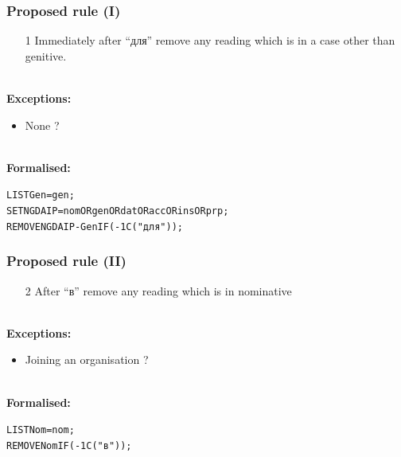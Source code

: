 \documentclass{beamer}
\begin{document}
\begin{frame}
  \frametitle{Proposed rule (I)}

  \begin{itemize}
    \item[1] Immediately after ``для'' remove any reading which is in a case other 
       than genitive.
  \end{itemize}
~\\
\textbf{Exceptions:}
  \begin{itemize}
    \item None ? 
  \end{itemize}
~\\
\textbf{Formalised:}

{\small
\begin{alltt}
  LIST Gen = gen ; \\
  SET NGDAIP = nom OR gen OR dat OR acc OR ins OR prp ;  \\
  REMOVE NGDAIP - Gen IF (-1C ("для")) ; \\
\end{alltt}
}
\end{frame}

\begin{frame}
  \frametitle{Proposed rule (II)}
 
  \begin{itemize}
    \item[2] After ``в'' remove any reading which is in nominative %

  \end{itemize}

~\\
\textbf{Exceptions:}
  \begin{itemize}
    \item Joining an organisation ?
  \end{itemize}

~\\
\textbf{Formalised:}
{\small
\begin{alltt}
  LIST Nom = nom ; \\
  REMOVE Nom IF (-1C ("в")) ;
\end{alltt}
}
\end{frame}
\end{document}
